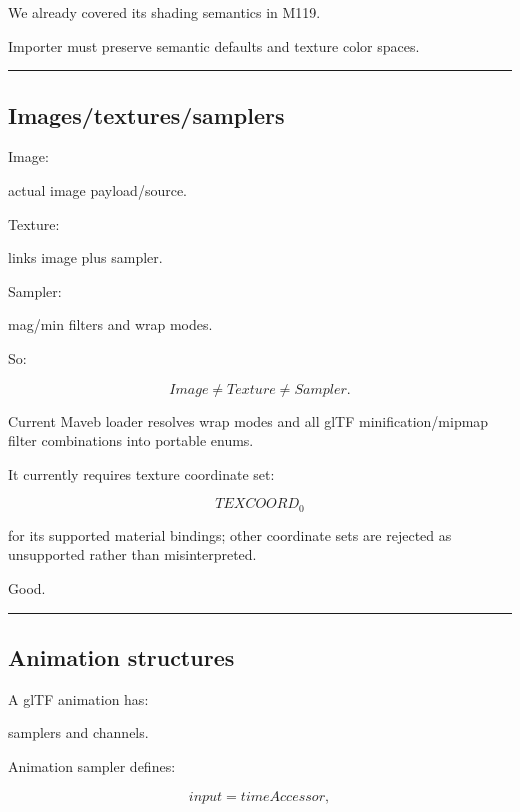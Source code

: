 We already covered its shading semantics in M119.

Importer must preserve semantic defaults and texture color spaces.

\begin{center}\rule{0.5\linewidth}{0.5pt}\end{center}

\subsection{Images/textures/samplers}\label{04-visual-computing-ii-ch041-imagestexturessamplers}

\hypertarget{04-visual-computing-ii-ch041-imagestexturessamplers}{}

Image:

actual image payload/source.

Texture:

links image plus sampler.

Sampler:

mag/min filters and wrap modes.

So:

\[
\boxed{
Image
\neq
Texture
\neq
Sampler.
}
\]

Current Maveb loader resolves wrap modes and all glTF minification/mipmap filter combinations into portable enums.

It currently requires texture coordinate set:

\[
TEXCOORD_0
\]

for its supported material bindings; other coordinate sets are rejected as unsupported rather than misinterpreted.

Good.

\begin{center}\rule{0.5\linewidth}{0.5pt}\end{center}

\subsection{Animation structures}\label{04-visual-computing-ii-ch041-animation-structures}

\hypertarget{04-visual-computing-ii-ch041-animation-structures}{}

A glTF animation has:

samplers and channels.

Animation sampler defines:

\[
input=timeAccessor,
\]

